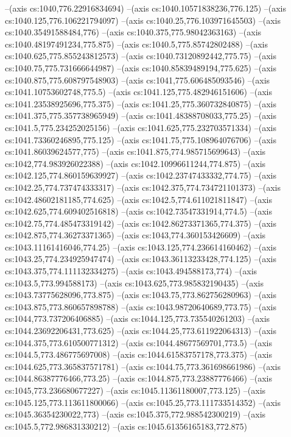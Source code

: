 --(axis cs:1040,776.22916834694)
--(axis cs:1040.10571838236,776.125)
--(axis cs:1040.125,776.106221794097)
--(axis cs:1040.25,776.103971645503)
--(axis cs:1040.35491588484,776)
--(axis cs:1040.375,775.98042363163)
--(axis cs:1040.48197491234,775.875)
--(axis cs:1040.5,775.85742802488)
--(axis cs:1040.625,775.855243812573)
--(axis cs:1040.73120892442,775.75)
--(axis cs:1040.75,775.731666644987)
--(axis cs:1040.85839489194,775.625)
--(axis cs:1040.875,775.608797548903)
--(axis cs:1041,775.606485093546)
--(axis cs:1041.10753602748,775.5)
--(axis cs:1041.125,775.482946151606)
--(axis cs:1041.23538925696,775.375)
--(axis cs:1041.25,775.360732840875)
--(axis cs:1041.375,775.357738965949)
--(axis cs:1041.48388708033,775.25)
--(axis cs:1041.5,775.234252025156)
--(axis cs:1041.625,775.232703571334)
--(axis cs:1041.73360246895,775.125)
--(axis cs:1041.75,775.108964076706)
--(axis cs:1041.86039624577,775)
--(axis cs:1041.875,774.985715699643)
--(axis cs:1042,774.983926022388)
--(axis cs:1042.10996611244,774.875)
--(axis cs:1042.125,774.860159639927)
--(axis cs:1042.23747433332,774.75)
--(axis cs:1042.25,774.737474333317)
--(axis cs:1042.375,774.734721101373)
--(axis cs:1042.48602181185,774.625)
--(axis cs:1042.5,774.611021811847)
--(axis cs:1042.625,774.609402516818)
--(axis cs:1042.73547331914,774.5)
--(axis cs:1042.75,774.485473319142)
--(axis cs:1042.86273371365,774.375)
--(axis cs:1042.875,774.36273371365)
--(axis cs:1043,774.360153426609)
--(axis cs:1043.11161416046,774.25)
--(axis cs:1043.125,774.236614160462)
--(axis cs:1043.25,774.234925947474)
--(axis cs:1043.36113233428,774.125)
--(axis cs:1043.375,774.111132334275)
--(axis cs:1043.494588173,774)
--(axis cs:1043.5,773.994588173)
--(axis cs:1043.625,773.985832190435)
--(axis cs:1043.73775628096,773.875)
--(axis cs:1043.75,773.862756280963)
--(axis cs:1043.875,773.860657898788)
--(axis cs:1043.98720640689,773.75)
--(axis cs:1044,773.737206406885)
--(axis cs:1044.125,773.735540261203)
--(axis cs:1044.23692206431,773.625)
--(axis cs:1044.25,773.611922064313)
--(axis cs:1044.375,773.610500771312)
--(axis cs:1044.48677569701,773.5)
--(axis cs:1044.5,773.486775697008)
--(axis cs:1044.61583757178,773.375)
--(axis cs:1044.625,773.365837571781)
--(axis cs:1044.75,773.361698661986)
--(axis cs:1044.86387776466,773.25)
--(axis cs:1044.875,773.23887776466)
--(axis cs:1045,773.236680677227)
--(axis cs:1045.11361180007,773.125)
--(axis cs:1045.125,773.113611800066)
--(axis cs:1045.25,773.111733514352)
--(axis cs:1045.36354230022,773)
--(axis cs:1045.375,772.988542300219)
--(axis cs:1045.5,772.986831330212)
--(axis cs:1045.61356165183,772.875)
